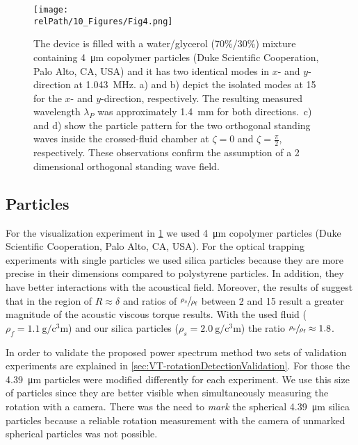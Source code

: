 \begin{figure}
    \centering
    \texttt{[image: \\relPath/10\_Figures/Fig4.png]}
    \caption{The device is filled with a water/glycerol (70$\%$/30$\%$) mixture 
    containing \SI{4}{\micro\meter} copolymer particles (Duke Scientific 
    Cooperation, Palo Alto, CA, USA) and it has two identical modes in $x$- and 
    $y$-direction at \SI{1.043}{\mega\hertz}. a) and b) depict the isolated 
    modes at \SI{15}{\Vrms} for the $x$- and $y$-direction, respectively. The 
    resulting measured wavelength $\lambda_{P}$ was approximately 
    \SI{1.4}{\milli\meter} for both directions.\ c) and d) show the particle 
    pattern for the two orthogonal standing waves inside the crossed-fluid 
    chamber at $\zeta= 0$ and $\zeta= \frac{\pi}{2}$, respectively. These 
    observations confirm the assumption of a 2 dimensional orthogonal standing 
    wave field.\label{fig:VT-Fig4}}
\end{figure}


\subsection{Particles \label{sec:VT-particles}}
For the visualization experiment in \cref{fig:VT-Fig4} we used \SI{4}{\micro\meter} 
copolymer particles (Duke Scientific Cooperation, Palo Alto, CA, USA). For the 
optical trapping experiments with single particles we used silica particles 
because they are more precise in their dimensions compared to polystyrene 
particles. In addition, they have better interactions
with the acoustical field. Moreover, the results of \citeauthor{Hahn2016} 
\cite{Hahn2016} suggest that in the region of $R \approx \delta$ and ratios of 
$\sfrac{\rho_{\text{s}}}{\rho_{\text{f}}}$ between 2 and 15 result a greater 
magnitude of the acoustic viscous torque results. With the used fluid ($\rho_{f} 
= \SI{1.1}{\gram\per\cubic\centi\meter}$) and our silica particles ($\rho_{s} = 
\SI{2.0}{\gram\per\cubic\centi\meter}$) the ratio 
$\sfrac{\rho_{\text{s}}}{\rho_{\text{f}}} \approx 1.8$.

In order to validate the proposed power spectrum method two sets of validation 
experiments are explained in \cref{sec:VT-rotationDetectionValidation}. For those 
the \SI{4.39}{\micro\meter} particles were modified differently for each 
experiment. We use this size of particles since they are better visible when 
simultaneously measuring the rotation with a camera. There was the need to 
\emph{mark} the spherical \SI{4.39}{\micro\meter} silica particles because a 
reliable rotation measurement with the camera of unmarked spherical particles 
was not possible.

